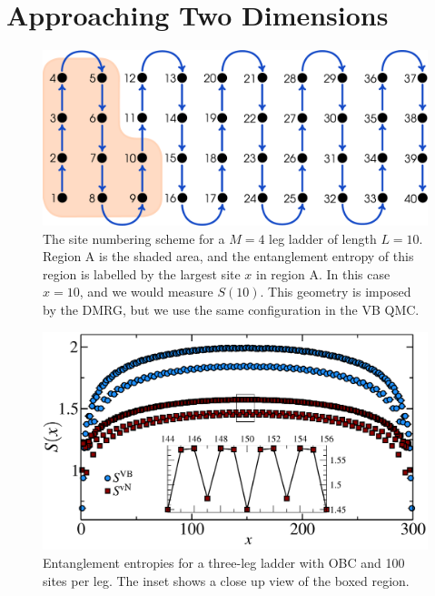 \section{Approaching Two Dimensions}

\begin{figure} { \includegraphics[width=6in]{./figures/made/stuff_covering.pdf}
\centering
\caption[Geometry of a four-leg ladder]{
The site numbering scheme for a $M=4$ leg ladder of length $L=10$.  Region A is the shaded area, and the entanglement entropy of this region is labelled by the largest site $x$ in region A.
In this case $x=10$, and we would measure $S(10)$.  
This geometry is imposed by the DMRG, but we use the same configuration in the VB QMC.
 \label{laddersnake} }} 
 \end{figure}

\begin{figure} { \includegraphics[width=6in]{./figures/paper1/figure3/3-leg-ladder/fig3_final2.pdf}
\caption[Entanglement entropies for a three-leg ladder]{
Entanglement entropies for a three-leg ladder with OBC and 100 sites per leg.  
The inset shows a close up view of the boxed region.
 \label{ladder3} }} 
 \end{figure}
  
